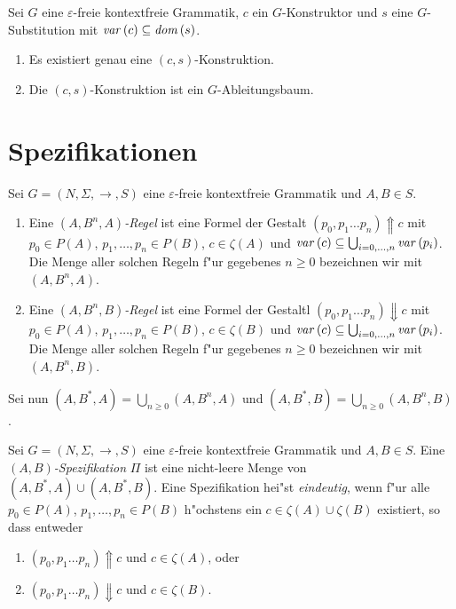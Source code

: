 \documentclass[12pt,a4paper]{article}
\begin{document}
\begin{lemma}
  Sei $G$ eine $\varepsilon$-freie kontextfreie Grammatik, $c$ ein $G$-Konstruktor und
  $s$ eine $G$-Substitution mit $\mathit{var}\,(c) \subseteq \mathit{dom}\,(s)$.
  \begin{enumerate}
  \item Es existiert genau eine $(c,s)$-Konstruktion.
  \item Die $(c,s)$-Konstruktion ist ein $G$-Ableitungsbaum.
  \end{enumerate}
\end{lemma}


\section{Spezifikationen}

\begin{definition}[Regeln]
  Sei $G=(N,\Sigma,\to,S)$ eine $\varepsilon$-freie kontextfreie Grammatik und $A,B \in S$.
  \begin{enumerate}
  \item Eine \emph{$(A,B^n,A)$-Regel} ist eine Formel der Gestalt $(p_0,p_1 \ldots p_n) \Uparrow c$ mit
    $p_0 \in P(A)$, $p_1,\ldots,p_n \in P(B)$, $c \in \zeta(A)$ und $\mathit{var}\,(c) \subseteq \bigcup_{i=0,\ldots,n} \mathit{var}\,(p_i)$.
    Die Menge aller solchen Regeln f"ur gegebenes $n \ge 0$ bezeichnen wir mit $(A,B^n,A)$.
  \item Eine \emph{$(A,B^n,B)$-Regel} ist eine Formel der Gestaltl $(p_0,p_1 \ldots p_n) \Downarrow c$ mit
    $p_0 \in P(A)$, $p_1,\ldots,p_n \in P(B)$, $c \in \zeta(B)$ und $\mathit{var}\,(c) \subseteq \bigcup_{i=0,\ldots,n} \mathit{var}\,(p_i)$.
    Die Menge aller solchen Regeln f"ur gegebenes $n \ge 0$ bezeichnen wir mit $(A,B^n,B)$.
  \end{enumerate}
  Sei nun $(A,B^*,A)=\bigcup_{n \ge 0}(A,B^n,A)$ und $(A,B^*,B)=\bigcup_{n \ge 0}(A,B^n,B)$.
\end{definition}

\begin{definition}[Spezifikation]
  Sei $G=(N,\Sigma,\to,S)$ eine $\varepsilon$-freie kontextfreie Grammatik und $A,B \in S$.
  Eine \emph{$(A,B)$-Spezifikation} $\Pi$ ist eine nicht-leere Menge von $(A,B^*,A) \cup (A,B^*,B)$.
  Eine Spezifikation hei"st \emph{eindeutig}, wenn f"ur alle $p_0 \in P(A)$, $p_1,\ldots,p_n \in P(B)$
  h"ochstens ein $c \in \zeta(A) \cup \zeta(B)$ existiert, so dass entweder
  \begin{enumerate}
  \item $(p_0,p_1 \ldots p_n) \Uparrow c$ und $c \in \zeta(A)$, oder
  \item $(p_0,p_1 \ldots p_n) \Downarrow c$ und $c \in \zeta(B)$.
  \end{enumerate}
\end{definition}
\end{document}
